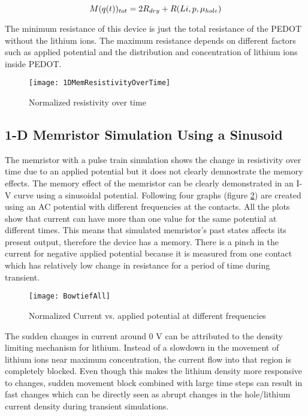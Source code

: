 \begin{doublespace}
\begin{equation}
\centering
M(q(t))_{tot}=2R_{dry}+R(Li,p,\mu_{hole})
\end{equation}

The minimum resistance of this device is just the total resistance of the PEDOT without the lithium ions. The maximum resistance depends on different factors such as applied potential and the distribution and concentration of lithium ions inside PEDOT.

\begin{figure}[!htp]
\centering
\texttt{[image: 1DMemResistivityOverTime]}
\caption{Normalized resistivity over time} 
\label{MemResistivityTrain}
\end{figure}

\clearpage
\subsection{1-D Memristor Simulation Using a Sinusoid}

The memristor with a pulse train simulation shows the change in resistivity over time due to an applied potential but it does not clearly demnostrate the memory effects. The memory effect of the memristor can be clearly demonstrated in an I-V curve using a sinusoidal potential. Following four graphs (figure \ref{Bowtie}) are created using an AC potential with different frequencies at the contacts. All the plots show that current can have more than one value for the same potential at different times. This means that simulated memristor's past states affects its present output, therefore the device has a memory. There is a pinch in the current for negative applied potential because it is measured from one contact which has relatively low change in resistance for a period of time during transient. 

\begin{figure}[!htp]
\centering
\texttt{[image: BowtiefAll]}
\caption{Normalized Current vs. applied potential at different frequencies} 
\label{Bowtie}
\end{figure}

The sudden changes in current around 0 V can be attributed to the density limiting mechanism for lithium. Instead of a slowdown in the movement of lithium ions near maximum concentration, the current flow into that region is completely blocked. Even though this makes the lithium density more responsive to changes, sudden movement block combined with large time steps can result in fast changes which can be directly seen as abrupt changes in the hole/lithium current density during transient simulations.  


\end{doublespace}
